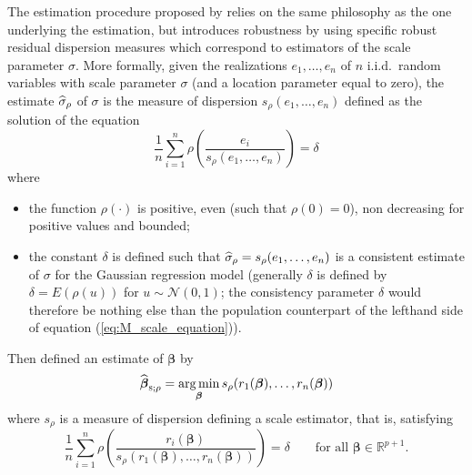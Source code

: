 The  estimation procedure proposed by \citet{rousseeuw:yohai:1984}
relies on the same philosophy as the one underlying the  estimation,
but introduces robustness by using specific robust residual dispersion measures
which correspond to  estimators of the scale parameter $\sigma$. More
formally, given the realizations $e_{1}, \dots, e_{n}$ of $n$ i.i.d.\ random
variables with scale parameter $\sigma$ (and a location parameter equal to
zero), the  estimate $\widehat{\sigma}_{\rho}$ of $\sigma$ is the
measure of dispersion $s_{\rho}(e_{1}, \dots, e_{n})$ defined as the solution
of the equation
%
\begin{equation}\label{eq:M_scale_equation}
    \frac{1}{n}\sum_{i=1}^{n} \rho\left(\frac{e_{i}}{s_{\rho}(e_{1}, \dots, e_{n})}\right) = \delta
\end{equation}
%
where
\begin{itemize}
    \item the function $\rho(\cdot)$ is positive, even (such that
    $\rho(0) = 0$), non decreasing for positive values and bounded;

    \item the constant $\delta$ is defined such that $\widehat{\sigma}_{\rho} =
    s_{\rho}(e_{1}, \dots, e_{n})$ is a consistent estimate of $\sigma$ for the
    Gaussian regression model (generally $\delta$ is defined by $\delta =
    E(\rho(u))$ for $u \sim \mathcal{N}(0,1)$; the consistency parameter
    $\delta$ would therefore be nothing else than the population counterpart of
    the lefthand side of equation (\ref{eq:M_scale_equation})).
\end{itemize}

Then \citet{rousseeuw:yohai:1984} defined an  estimate of
$\boldsymbol\beta$ by
\[
    \sthat{\boldsymbol\beta}_{\stsc{S};\rho} 
    = \argmin_{\boldsymbol\beta}s_{\rho} (r_{1}(\boldsymbol\beta), \dots, r_{n}(\boldsymbol{\beta}))
\]
where $s_{\rho}$ is a measure of dispersion defining a scale  estimator, that is,
satisfying
%
\begin{equation}\label{eq:M_scale_equation_res}
    \frac{1}{n}\sum_{i=1}^{n} \rho\left(\frac{r_{i}(\boldsymbol{\beta})}%
        {s_{\rho}(r_{1}(\boldsymbol\beta), \dots, r_{n}(\boldsymbol\beta))}\right) = \delta
    \qquad\text{for all $\boldsymbol\beta \in \mathbb{R}^{p+1}$.}
\end{equation}

